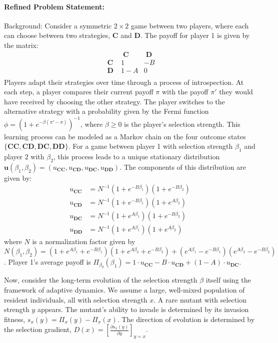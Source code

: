 \documentclass[10pt]{article}
\begin{document}
\paragraph*{Refined Problem Statement:}
Background:
Consider a symmetric $2 \times 2$ game between two players, where each can choose between two strategies, $\mathbf{C}$ and $\mathbf{D}$. The payoff for player 1 is given by the matrix:
\begin{equation*}
	\begin{array}{c|cc}
		&\mathbf{\;C\;} &\mathbf{\;D\;}\\
		\hline
		\mathbf{\;C\;} &1 &-B \\
		\mathbf{\;D\;} &1-A &0 \\
	\end{array}
\end{equation*}
Players adapt their strategies over time through a process of introspection. At each step, a player compares their current payoff $\pi$ with the payoff $\pi'$ they would have received by choosing the other strategy. The player switches to the alternative strategy with a probability given by the Fermi function $\phi = (1+e^{-\beta(\pi'-\pi)})^{-1}$, where $\beta \ge 0$ is the player's selection strength. This learning process can be modeled as a Markov chain on the four outcome states $\{\mathbf{CC}, \mathbf{CD}, \mathbf{DC}, \mathbf{DD}\}$. For a game between player 1 with selection strength $\beta_1$ and player 2 with $\beta_2$, this process leads to a unique stationary distribution $\mathbf{u}(\beta_1, \beta_2) = (u_{\mathbf{CC}}, u_{\mathbf{CD}}, u_{\mathbf{DC}}, u_{\mathbf{DD}})$. The components of this distribution are given by:
\begin{align*}
u_{\mathbf{CC}} &= N^{-1} (1+e^{-B\beta_1})(1+e^{-B\beta_2}) \\
u_{\mathbf{CD}} &= N^{-1} (1+e^{-B\beta_1})(1+e^{A\beta_2}) \\
u_{\mathbf{DC}} &= N^{-1} (1+e^{A\beta_1})(1+e^{-B\beta_2}) \\
u_{\mathbf{DD}} &= N^{-1} (1+e^{A\beta_1})(1+e^{A\beta_2})
\end{align*}
where $N$ is a normalization factor given by $N(\beta_1, \beta_2) = (1+e^{A\beta_1}+e^{-B\beta_1})(1+e^{A\beta_2}+e^{-B\beta_2}) + (e^{A\beta_1}-e^{-B\beta_1})(e^{A\beta_2}-e^{-B\beta_2})$. Player 1's average payoff is $\Pi_{\beta_2}(\beta_1) = 1 \cdot u_\mathbf{CC} -B\cdot u_\mathbf{CD} +(1-A)\cdot u_\mathbf{DC}$.

Now, consider the long-term evolution of the selection strength $\beta$ itself using the framework of adaptive dynamics. We assume a large, well-mixed population of resident individuals, all with selection strength $x$. A rare mutant with selection strength $y$ appears. The mutant's ability to invade is determined by its invasion fitness, $s_x(y) = \Pi_x(y) - \Pi_x(x)$. The direction of evolution is determined by the selection gradient, $D(x) = \left[ \frac{\partial s_x(y)}{\partial y } \right]_{y=x}$.
\end{document}
